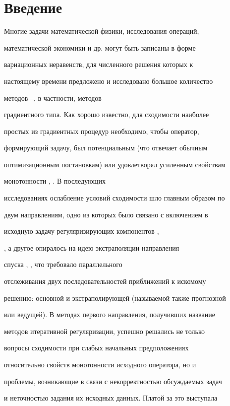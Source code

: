 \section{Введение}





Многие задачи математической физики, исследования операций,


математической экономики и др. могут быть записаны в форме


вариационных неравенств, для численного решения которых к


настоящему времени предложено и исследовано большое количество


методов \cite{kinder}--\cite{kokur}, в частности, методов


градиентного типа. Как хорошо известно, для сходимости наиболее


простых из градиентных процедур необходимо, чтобы оператор,


формирующий задачу, был потенциальным (что отвечает обычным


оптимизационным постановкам) или удовлетворял усиленным свойствам


монотонности \cite{vasil}, \cite{polak}. В последующих


исследованиях ослабление условий сходимости шло главным образом по


двум направлениям, одно из которых было связано с включением в


исходную задачу регуляризирующих компонентов \cite{baku2},


\cite{baku3}, а другое опиралось на идею экстраполяции направления


спуска \cite{ant2}, \cite{korpel}, что требовало параллельного


отслеживания двух последовательностей приближений к искомому


решению: основной и экстраполирующей (называемой также прогнозной


или ведущей). В методах первого направления, получивших название


методов итеративной регуляризации, успешно решались не только


вопросы сходимости при слабых начальных предположениях


относительно свойств монотонности исходного оператора, но и


проблемы, возникающие в связи с некорректностью обсуждаемых задач


и неточностью задания их исходных данных. Платой за это выступала


